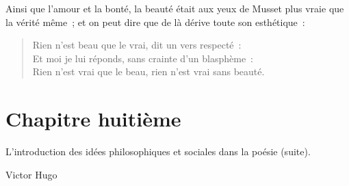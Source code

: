 \documentclass[french,twoside]{book} %
\newcommand\chapteropen{} %
\newcommand\chapterclose{} %
\begin{document}
\noindent Ainsi que l’amour et la bonté, la beauté était aux yeux de Musset plus vraie que la vérité même ; et on peut dire que de là dérive toute son esthétique :\par


\begin{verse}
Rien n’est beau que le vrai, dit un vers respecté :\\
Et moi je lui réponds, sans crainte d’un blasphème :\\
Rien n’est vrai que le beau, rien n’est vrai sans beauté.\\
\end{verse}

\chapterclose


\chapteropen
\chapter[{Chapitre huitième}]{Chapitre huitième}\renewcommand{\leftmark}{Chapitre huitième}

\begin{center}L’introduction des idées philosophiques et sociales dans la poésie (suite).\end{center}
\begin{center}Victor Hugo\end{center}
\end{document}
